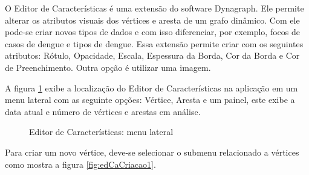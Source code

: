 O Editor de Características é uma extensão do software Dynagraph. Ele permite alterar os atributos visuais dos vértices e aresta de um grafo dinâmico. Com ele pode-se criar novos tipos de dados e com isso diferenciar, por exemplo, focos de casos de dengue e tipos de dengue.
Essa extensão permite criar com os seguintes atributos: Rótulo, Opacidade, Escala, Espessura da Borda, Cor da Borda e Cor de Preenchimento. Outra opção é utilizar uma imagem.
 
A figura \ref{fig:edCaMenu} exibe a localização do Editor de Características na aplicação em um menu lateral com as seguinte opções: Vértice, Aresta e um painel, este exibe a data atual e número de vértices e arestas em análise.
\begin{figure}[!ht]
	\centering	
	\caption{\label{fig:edCaMenu} Editor de Características: menu lateral}
\end{figure}
\FloatBarrier

Para criar um novo vértice, deve-se selecionar o submenu relacionado a vértices como mostra a figura \ref{fig:edCaCriacao1}.
\begin{figure}[!ht]
	\centering	
\end{figure}
\FloatBarrier

